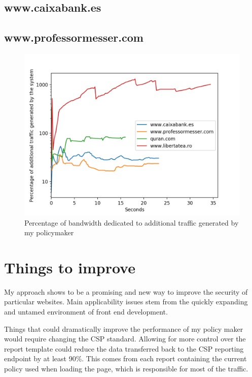 \subsection{www.caixabank.es}

\subsection{www.professormesser.com}


\begin{figure}[h]
	\centering
	\includegraphics[width=\textwidth]{imgs/netword_usage_plot.png}
	\caption{Percentage of bandwidth dedicated to additional traffic generated by my policymaker}
\end{figure}


\section{Things to improve}

My approach shows to be a promising and new way to improve the security of particular websites.
Main applicability issues stem from the quickly expanding and untamed environment of front end development.

Things that could dramatically improve the performance of my policy maker would require changing the CSP standard.
Allowing for more control over the report template could reduce the data transferred back to the CSP reporting endpoint by at least 90\%.
This comes from each report containing the current policy used when loading the page, which is responsible for most of the traffic.

